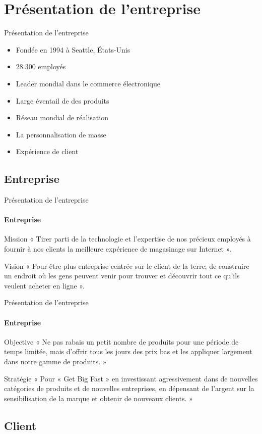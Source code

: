 \section[Présentation de l'entreprise]{Présentation de l'entreprise}
\begin{frame}{Présentation de l'entreprise}
	\begin{itemize}
	    \item Fondée en 1994 à Seattle, États-Unis
	    \item 28.300 employés
	    \item Leader mondial dans le commerce électronique
	    \item Large éventail de des produits
        \item Réseau mondial de réalisation 
        \item La personnalisation de masse
        \item Expérience de client
	\end{itemize}
\end{frame}

\subsection{Entreprise}
\begin{frame}{Présentation de l'entreprise}
    \framesubtitle{Entreprise}
     \begin{block}{Mission}
      « Tirer parti de la technologie et l'expertise de nos précieux employés à fournir à nos clients la meilleure expérience de magasinage sur Internet ».
     \end{block}
     \begin{block}{Vision}
      « Pour être plus entreprise centrée sur le client de la terre; de construire un endroit où les gens peuvent venir pour trouver et découvrir tout ce qu'ils veulent acheter en ligne ».
     \end{block}
 \end{frame}
 
\begin{frame}{Présentation de l'entreprise}
     \framesubtitle{Entreprise}
     \begin{block}{Objective}
     « Ne pas rabais un petit nombre de produits pour une période de temps limitée, mais d'offrir tous les jours des prix bas et les appliquer largement dans notre gamme de produits. »
     \end{block}
     \begin{block}{Stratégie}
     « Pour « Get Big Fast » en investissant agressivement dans de nouvelles catégories de produits et de nouvelles entreprises, en dépensant de l'argent sur la sensibilisation de la marque et obtenir de nouveaux clients. »
     \end{block}
 \end{frame}
 
 \subsection{Client}
 \begin{frame}
 \end{frame}